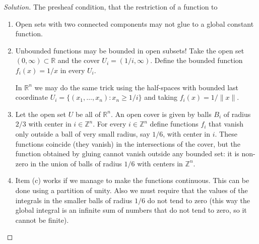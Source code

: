 \begin{proof}[Solution]\leavevmode
The presheaf condition, that the restriction of a function to 
	\begin{enumerate}[label=(\alph*)]
\item Open sets with two connected components may not glue to a global constant function.

\item Unbounded functions may be bounded in open subsets! Take the open set $(0,\infty)\subset \mathbb{R}$ and the cover $U_i=(1/i,\infty)$. Define the bounded function $f_i(x)=1/x$ in every $U_i$.

	In $\mathbb{R}^n$ we may do the same trick using the half-spaces with bounded last coordinate $U_i=\{(x_1,\ldots,x_n):x_n \geq 1/i\}$ and taking  $f_i(x)=1/\|x\|$.

\item Let the open set $U$ be all of $\mathbb{R}^n$. An open cover is given by balls $B_i$ of radius $2/3$ with center in  $i \in\mathbb{Z}^n$.  For every $i \in \mathbb{Z}^n$ define functions $f_i$ that vanish only outside a ball of very small radius, say $1/6$, with center in $i$. These functions coincide (they vanish) in the intersections of the cover, but the function obtained by gluing cannot vanish outside any bounded set: it is non-zero in the union of balls of radius $1/6$ with centers in  $\mathbb{Z}^n$.

\item Item (c) works if we manage to make the functions continuous. This can be done using a {\color{2}partition of unity}. Also we must require that the values of the integrals in the smaller balls of radius $1/6$ do not tend to zero (this way the global integral is an infinite sum of numbers that do not tend to zero, so it cannot be finite).
\end{enumerate}
\end{proof}


